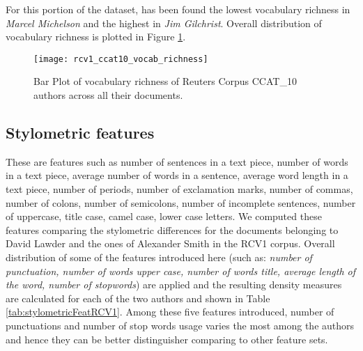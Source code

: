 For this portion of the dataset, has been found the lowest vocabulary richness in \textit{Marcel Michelson} and the highest in \textit{Jim Gilchrist}.
Overall distribution of
vocabulary richness is plotted in Figure \ref{fig:rcv1_ccat10_vocab_richness}.

\begin{figure}[ht]
	\centering
	\texttt{[image: rcv1\_ccat10\_vocab\_richness]}
	\caption[Vocabularity Richness of the Reuters Corpus.]{Bar Plot of vocabulary richness of Reuters Corpus CCAT\_10 authors across all their documents.}
	\label{fig:rcv1_ccat10_vocab_richness}
\end{figure}

\subsection{Stylometric features}

These are features such as number of sentences in a text piece, number of words in a text piece, average number of words in a sentence, average word length in a text piece, number of periods, number of exclamation marks, number of commas, number of colons, number of semicolons, number of incomplete sentences, number of uppercase, title case, camel case, lower case letters. We computed these features comparing the stylometric differences for the documents belonging to David Lawder and the ones of Alexander Smith in the RCV1 corpus. Overall distribution of some of the features introduced here (such as: \textit{number of punctuation, number of words upper case, number of words title, average length of the word, number of stopwords}) are applied and the resulting density measures are calculated for each of the two authors and shown in Table \ref{tab:stylometricFeatRCV1}. Among these five features introduced, number of punctuations and number of stop words usage varies the most among the authors and hence they can be better distinguisher comparing to other feature sets.

